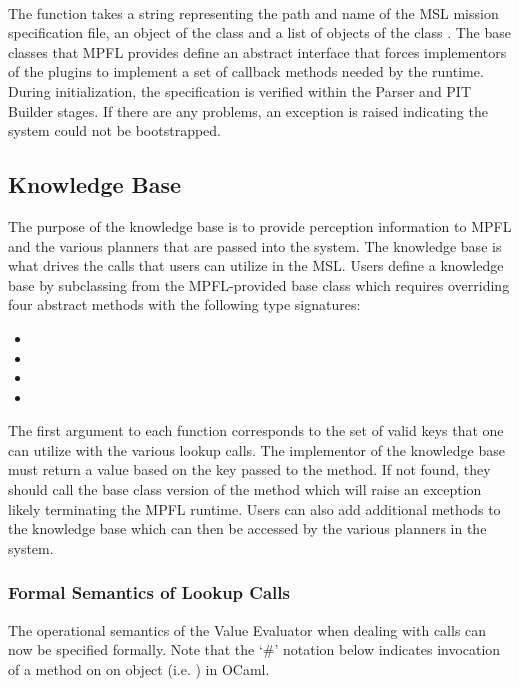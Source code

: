 \begin{center}
\\
\end{center}

The function  takes a string representing the path and name of the MSL mission specification file, an object of the class  and a list of objects of the class . The base classes that MPFL provides define an abstract interface that forces implementors of the plugins to implement a set of callback methods needed by the runtime. During initialization, the specification is verified within the Parser and PIT Builder stages. If there are any problems, an exception is raised indicating the system could not be bootstrapped.

\subsection{Knowledge Base}
The purpose of the knowledge base is to provide perception information to MPFL and the various planners that are passed into the system. The knowledge base is what drives the  calls that users can utilize in the MSL. Users define a knowledge base by subclassing from the MPFL-provided base class  which requires overriding four abstract methods with the following type signatures:

\begin{itemize}
\item {}
\item {}
\item {}
\item {}
\end{itemize}

The first argument to each function corresponds to the set of valid keys that one can utilize with the various lookup calls. The implementor of the knowledge base must return a value based on the key passed to the method. If not found, they should call the base class version of the method which will raise an exception likely terminating the MPFL runtime. Users can also add additional methods to the knowledge base which can then be accessed by the various planners in the system. 

\subsubsection{Formal Semantics of Lookup Calls}
The operational semantics of the Value Evaluator when dealing with  calls can now be specified formally. Note that the `\#' notation below indicates invocation of a method on on object (i.e. ) in OCaml.

